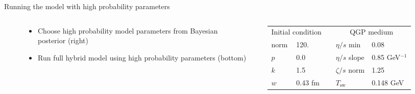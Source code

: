 \documentclass[xcolor=dvipsnames, aspectratio=169]{beamer}
\begin{document}
\begin{frame}[plain]
\end{frame}


\begin{frame}[t]{Running the model with high probability parameters}
    \centering \vspace{0.4 cm}
    \begin{columns}[T]
        \begin{column}{0.05\textwidth}
        \end{column}
        \begin{column}{0.4\textwidth}
            \scriptsize
            \begin{itemize}
                \item Choose high probability model parameters 
                      from Bayesian\\ posterior (right)
                \smallskip
                \item Run full hybrid model using high probability 
                      parameters (bottom)
            \end{itemize}
        \end{column}
        \begin{column}{0.46\textwidth}
            \scriptsize
            \begin{tabular}{lllll}
                \multicolumn{2}{c}{Initial condition} & & 
                    \multicolumn{2}{c}{QGP medium} \\
                \noalign{\smallskip}\hline\noalign{\medskip}
                norm & 120.          &&  $\eta/s$ min   & 0.08       \\
                $p$  & 0.0           &&  $\eta/s$ slope & 0.85 GeV$^{-1}$   \\
                $k$  & 1.5           &&  $\zeta/s$ norm & 1.25       \\
                $w$  & 0.43 fm       &&  $T_\text{sw}$  & 0.148 GeV  \\
            \end{tabular}
        \end{column}
        \begin{column}{0.05\textwidth}
        \end{column}
    \end{columns}
    \vspace{0.5 cm}

\end{frame}
\end{document}

